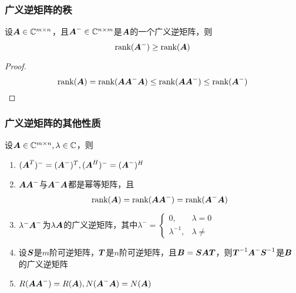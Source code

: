 \documentclass[12pt, a4paper, oneside, UTF8]{ctexbook}
\begin{document}
\subsubsection{广义逆矩阵的秩}
\begin{corollary}{}{}
    设$\A\in\C^{m\times n}$，且$\A^-\in\C^{n\times m}$是$\A$的一个广义逆矩阵，则\[\rank(\A^-)\geq\rank(\A)\]
\end{corollary}
\begin{proof}

    \[\rank(\A)=\rank(\A\A^-\A)\leq \rank(\A\A^-)\leq\rank(\A^-)\]
\end{proof}

\subsubsection{广义逆矩阵的其他性质}
\begin{them}{}{}
    设$\A\in\C^{m\times n}, \lambda\in\C$，则
    \begin{enumerate}
        \item $(\A^T)^-=(\A^-)^T, (\A^H)^-=(\A^-)^H$
        \item $\A\A^-$与$\A^-\A$都是幂等矩阵，且\[\rank(\A)=\rank(\A\A^-)=\rank(\A^-\A)\]
        \item $\lambda^-\A^-$为$\lambda\A$的广义逆矩阵，其中$\lambda^-=\begin{cases}0,&\lambda=0\\\lambda^{-1},&\lambda\neq\end{cases}$
        \item 设$\bs{S}$是$m$阶可逆矩阵，$\bs{T}$是$n$阶可逆矩阵，且$\B=\bs{SAT}$，则$\bs{T}^{-1}\A^-\bs{S}^{-1}$是$\B$的广义逆矩阵
        \item $R(\A\A^-)=R(\A), N(\A^-\A)=N(\A)$
    \end{enumerate}
\end{them}
\end{document}
